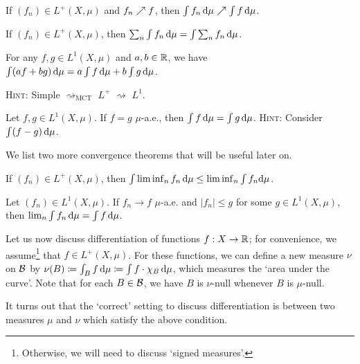 \documentclass[reqno, twoside]{article}
\begin{document}
    \begin{theorem}
        If $(f_n)\in L^+(X,\mu)$ and $f_n\nearrow f$, then $\int f_n\,\mathrm{d}\mu\nearrow\int f\,\mathrm{d}\mu$.
    \end{theorem}

    \begin{corollary}
        If $(f_n)\in L^+(X,\mu)$, then $\sum_n\int f_n\,\mathrm{d}\mu=\int\sum_nf_n\,\mathrm{d}\mu$.
    \end{corollary}

    \begin{exercise}
        For any $f,g\in L^1(X,\mu)$ and $a,b\in\mathbb{R}$, we have $\int(af+bg)\,\mathrm{d}\mu=a\int f\,\mathrm{d}\mu+b\int g\,\mathrm{d}\mu$.

        \textsc{Hint:} Simple $\rightsquigarrow_\textrm{MCT}$ $L^+$ $\rightsquigarrow$ $L^1$.
    \end{exercise}

    \begin{exercise}
        Let $f,g\in L^1(X,\mu)$. If $f=g$ $\mu$-a.e., then $\int f\,\mathrm{d}\mu=\int g\,\mathrm{d}\mu$. \textsc{Hint:} Consider $\int(f-g)\,\mathrm{d}\mu$.
    \end{exercise}

    We list two more convergence theorems that will be useful later on.

    \begin{theorem}
        If $(f_n)\in L^+(X,\mu)$, then $\int\liminf_nf_n\,\mathrm{d}\mu\leq\liminf_n\int f_n\mathrm{d}\mu$.
    \end{theorem}

    \begin{theorem}
        Let $(f_n)\in L^1(X,\mu)$. If $f_n\to f$ $\mu$-a.e. and $|f_n|\leq g$ for some $g\in L^1(X,\mu)$, then $\lim_n\int f_n\,\mathrm{d}\mu=\int f\,\mathrm{d}\mu$.
    \end{theorem}

    Let us now discuss differentiation of functions $f:X\to\mathbb{R}$; for convenience, we assume\footnote{Otherwise, we will need to discuss `signed measures'.} that $f\in L^+(X,\mu)$. For these functions, we can define a new measure $\nu$ on $\mathcal{B}$ by $\nu(B)\coloneqq\int_Bf\,\mathrm{d}\mu\coloneqq\int f\cdot\chi_B\,\mathrm{d}\mu$, which measures the `area under the curve'. Note that for each $B\in\mathcal{B}$, we have $B$ is $\nu$-null whenever $B$ is $\mu$-null.

    It turns out that the `correct' setting to discuss differentiation is between two measures $\mu$ and $\nu$ which satisfy the above condition.
\end{document}
